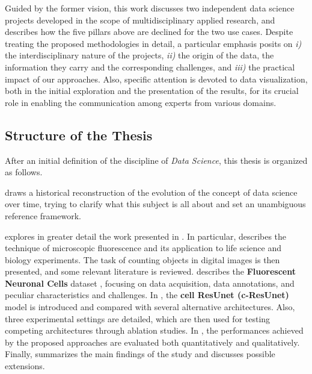 Guided by the former vision, this work discusses two independent data science projects developed in the scope of multidisciplinary applied research, and describes how the five pillars above are declined for the two use cases.
Despite treating the proposed methodologies in detail, a particular emphasis posits on \textit{i)} the interdisciplinary nature of the projects, \textit{ii)} the origin of the data, the information they carry and the corresponding challenges, and \textit{iii)} the practical impact of our approaches.
Also, specific attention is devoted to data visualization, both in the initial exploration and the presentation of the results, for its crucial role in enabling the communication among experts from various domains.

\subsection*{Structure of the Thesis}

After an initial definition of the discipline of \emph{Data Science}, this thesis is organized as follows.

 draws a historical reconstruction of the evolution of the concept of data science over time, trying to clarify what this subject is all about and set an unambiguous reference framework. 

 explores in greater detail the work presented in . In particular,  describes the technique of microscopic fluorescence and its application to life science and biology experiments. The task of counting objects in digital images is then presented, and some relevant literature is reviewed.
 describes the \textbf{Fluorescent Neuronal Cells} dataset \cite{clissa2021fluocells}, focusing on data acquisition, data annotations, and peculiar characteristics and challenges. 
In , the \textbf{cell ResUnet (c-ResUnet)} \cite{morelli2021cresunet} model is introduced and compared with several alternative architectures. Also, three experimental settings are detailed, which are then used for testing competing architectures through ablation studies.
In , the performances achieved by the proposed approaches are evaluated both quantitatively and qualitatively.
Finally,  summarizes the main findings of the study and discusses possible extensions.

